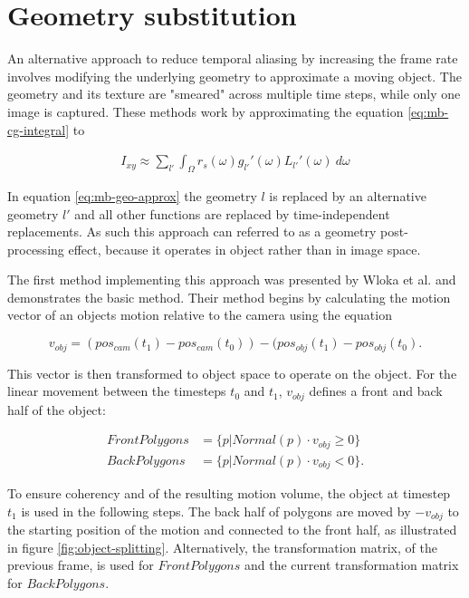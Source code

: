
\section{Geometry substitution}
\label{ch:mb-gs}
An alternative approach to reduce temporal aliasing by increasing the frame rate involves modifying the underlying geometry to approximate a moving object.
The geometry and its texture are "smeared" across multiple time steps, while only one image is captured.
These methods work by approximating the equation \ref{eq:mb-cg-integral} to 

\begin{align}
    I_{xy} \approx \sum_{l'} \int_\Omega r_s(\omega)g_{l'}'(\omega)L_{l'}'(\omega) \: d\omega
    \label{eq:mb-geo-approx}
\end{align}

In equation \ref{eq:mb-geo-approx} the geometry $l$ is replaced by an alternative geometry $l'$ and all other functions are replaced by time-independent replacements.
As such this approach can referred to as a geometry post-processing effect, because it operates in object rather than in image space.

The first method implementing this approach was presented by Wloka et al. \cite{Wloka.1996} and demonstrates the basic method.
Their method begins by calculating the motion vector of an objects motion relative to the camera using the equation

$$
v_{obj} = (pos_{cam}(t_1) - pos_{cam}(t_0)) - (pos_{obj}(t_1) - pos_{obj}(t_0).
$$

This vector is then transformed to object space to operate on the object.
For the linear movement between the timesteps $t_0$ and $t_1$, $v_{obj}$ defines a front and back half of the object:

\begin{align}
    FrontPolygons &= \{ p |  Normal(p) \cdot v_{obj} \geq 0 \} \\
    BackPolygons  &= \{ p |  Normal(p) \cdot v_{obj} < 0 \}.
\end{align}

To ensure coherency and of the resulting motion volume, the object at timestep $t_1$ is used in the following steps.
The back half of polygons are moved by $-v_{obj}$ to the starting position of the motion and connected to the front half, as illustrated in figure \ref{fig:object-splitting}.
Alternatively, the transformation matrix, of the previous frame, is used for $FrontPolygons$ and the current transformation matrix for $BackPolygons$.

